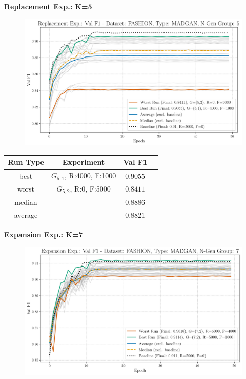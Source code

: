 \noindent\textbf{Replacement Exp.: K=5}
\begin{figure}[htbp]
	\centering
	\includegraphics[width=.85\textwidth]{abb/strat_classifier_performance/FASHION_STRATIFIED_CLASSIFIERS_MADGAN_NEW/replacement_experiments/val_f1_score_MADGAN_FASHION_n_gen_5_all.png}
	\label{fig:app_strat_class_performance_replacement_exp._val_f1_score_5}
\end{figure}
\begin{table}[H]
	\vspace{-1em}
	\centering
	\begin{tabular}{|c|c|c|c|}
		\hline
		Run Type & Experiment & Val F1 \\ \hline
		best & \(G_{5, 1}\), R:4000, F:1000 & $0.9055$\\ \hline
		worst & \(G_{5, 2}\), R:0, F:5000 & $0.8411$\\ \hline
		median & - & $0.8886$\\ \hline
		average & - & $0.8821$
		\\ \hline
	\end{tabular}
\end{table}
\newpage
\noindent\textbf{Expansion Exp.: K=7}
\begin{figure}[htbp]
	\centering
	\includegraphics[width=.85\textwidth]{abb/strat_classifier_performance/FASHION_STRATIFIED_CLASSIFIERS_MADGAN_NEW/expansion_experiments/val_f1_score_MADGAN_FASHION_n_gen_7_all.png}
	\label{fig:app_strat_class_performance_expansion_exp._val_f1_score_7}
\end{figure}
